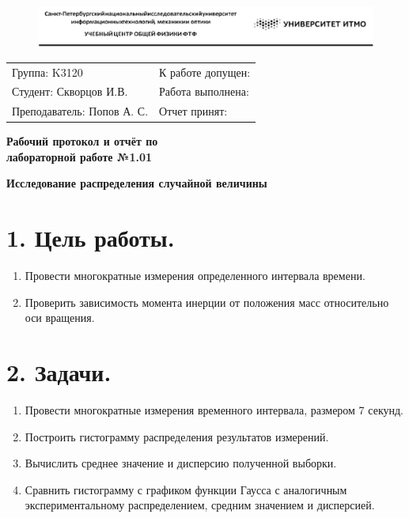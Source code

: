 \documentclass[14pt]{extreport}
\begin{document}
\begin{figure}[]
		\includegraphics[scale=0.66]{itmo_image.png}
		\label{pic1}
\end{figure}
\begin{flushleft}
\begin{tabular}{ p{9cm}p{8cm} }
 Группа: K3120 & К работе допущен: \\ 
 Студент: Скворцов И.В. & Работа выполнена: \\  
 Преподаватель: Попов А. С. & Отчет принят: \\    
\end{tabular}
\end{flushleft}

\begin{center}
\Large\textbf{Рабочий протокол и отчёт по\\лабораторной работе №1.01}

\large\textbf{Исследование распределения случайной величины}
\end{center}

\section*{1. Цель работы.}

\begin{enumerate}
    \item Провести многократные измерения определенного интервала времени. 
    \item Проверить зависимость момента инерции от положения масс относительно оси вращения.
\end{enumerate}


\section*{2. Задачи.}
\begin{enumerate}
    \item Провести многократные измерения временного интервала, размером 7 секунд.
    \item Построить гистограмму распределения результатов измерений.
    \item Вычислить среднее значение и дисперсию полученной выборки.
    \item Сравнить гистограмму с графиком функции Гаусса с аналогичным экспериментальному распределением, средним значением и дисперсией.
\end{enumerate}
\end{document}
